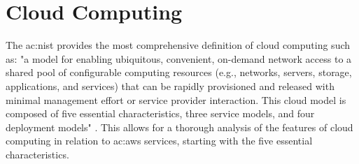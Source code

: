 \section{Cloud Computing}
The \gls{ac:nist} provides the most comprehensive definition of cloud computing such as: "a model for enabling ubiquitous, convenient, on-demand network access to a shared pool of configurable computing resources (e.g., networks, servers, storage, applications, and services) that can be rapidly provisioned and released with minimal management effort or service provider interaction. This cloud model is composed of five essential characteristics, three service models, and four deployment models" \cite{NISTCloudComputing}. This allows for a thorough analysis of the features of cloud computing in relation to \gls{ac:aws} services, starting with the five essential characteristics.
